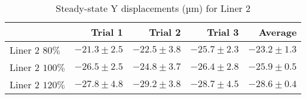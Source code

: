 \begin{table}[htbp!]
\centering
\begin{tabular}{lrrrr}
\toprule
  & Trial 1 & Trial 2 & Trial 3 & Average \\
\midrule
 Liner 2 $80\%$ & $-21.3 \pm 2.5$ & $-22.5 \pm 3.8$ & $-25.7 \pm 2.3$ & $-23.2 \pm 1.3$ \\
 Liner 2 $100\%$ & $-26.5 \pm 2.5$ & $-24.8 \pm 3.7$ & $-26.4 \pm 2.8$ & $-25.9 \pm 0.5$ \\
 Liner 2 $120\%$ & $-27.8 \pm 4.8$ & $-29.2 \pm 3.8$ & $-28.7 \pm 4.5$ & $-28.6 \pm 0.4$ \\
\bottomrule
\end{tabular}
\caption{Steady-state Y displacements (µm) for Liner 2}
\label{fig:liner_2_results_table}
\end{table}